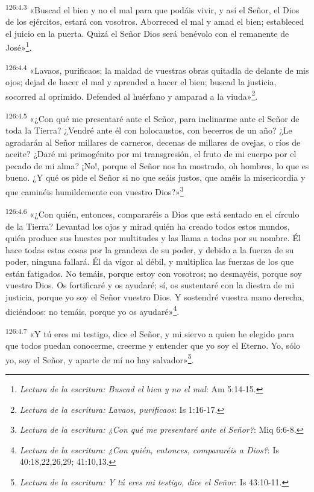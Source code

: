 \par
\textsuperscript{126:4.3} «Buscad el bien y no el mal para que podáis vivir, y así el Señor, el Dios de los ejércitos, estará con vosotros. Aborreced el mal y amad el bien; estableced el juicio en la puerta. Quizá el Señor Dios será benévolo con el remanente de José»\footnote{\textit{Lectura de la escritura: Buscad el bien y no el mal}: Am 5:14-15.}.

\par
\textsuperscript{126:4.4} «Lavaos, purificaos; la maldad de vuestras obras quitadla de delante de mis ojos; dejad de hacer el mal y aprended a hacer el bien; buscad la justicia, socorred al oprimido. Defended al huérfano y amparad a la viuda»\footnote{\textit{Lectura de la escritura: Lavaos, purificaos}: Is 1:16-17.}.

\par
\textsuperscript{126:4.5} «¿Con qué me presentaré ante el Señor, para inclinarme ante el Señor de toda la Tierra? ¿Vendré ante él con holocaustos, con becerros de un año? ¿Le agradarán al Señor millares de carneros, decenas de millares de ovejas, o ríos de aceite? ¿Daré mi primogénito por mi transgresión, el fruto de mi cuerpo por el pecado de mi alma? ¡No!, porque el Señor nos ha mostrado, oh hombres, lo que es bueno. ¿Y qué os pide el Señor si no que seáis justos, que améis la misericordia y que caminéis humildemente con vuestro Dios?»\footnote{\textit{Lectura de la escritura: ¿Con qué me presentaré ante el Señor?}: Miq 6:6-8.}

\par
\textsuperscript{126:4.6} «¿Con quién, entonces, compararéis a Dios que está sentado en el círculo de la Tierra? Levantad los ojos y mirad quién ha creado todos estos mundos, quién produce sus huestes por multitudes y las llama a todas por su nombre. Él hace todas estas cosas por la grandeza de su poder, y debido a la fuerza de su poder, ninguna fallará. Él da vigor al débil, y multiplica las fuerzas de los que están fatigados. No temáis, porque estoy con vosotros; no desmayéis, porque soy vuestro Dios. Os fortificaré y os ayudaré; sí, os sustentaré con la diestra de mi justicia, porque yo soy el Señor vuestro Dios. Y sostendré vuestra mano derecha, diciéndoos: no temáis, porque yo os ayudaré»\footnote{\textit{Lectura de la escritura: ¿Con quién, entonces, compararéis a Dios?}: Is 40:18,22,26,29; 41:10,13.}.

\par
\textsuperscript{126:4.7} «Y tú eres mi testigo, dice el Señor, y mi siervo a quien he elegido para que todos puedan conocerme, creerme y entender que yo soy el Eterno. Yo, sólo yo, soy el Señor, y aparte de mí no hay salvador»\footnote{\textit{Lectura de la escritura: Y tú eres mi testigo, dice el Señor}: Is 43:10-11.}.

